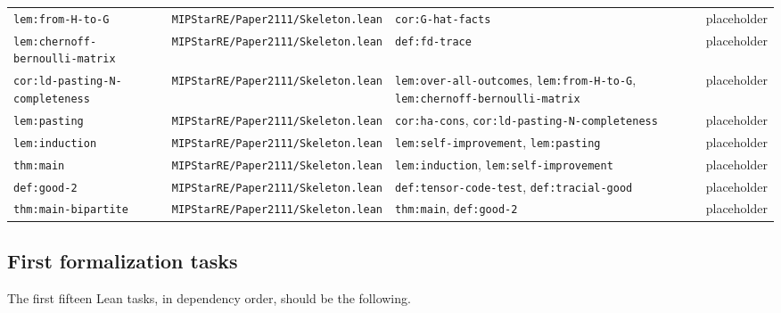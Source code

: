 \documentclass{article}
\theoremstyle{remark}
\begin{document}
\begin{longtable}{L{0.18\textwidth}L{0.25\textwidth}L{0.32\textwidth}L{0.13\textwidth}}
\texttt{lem:from-H-to-G} & \texttt{MIPStarRE/Paper2111/Skeleton.lean} & \texttt{cor:G-hat-facts} & placeholder \\
\texttt{lem:chernoff-bernoulli-matrix} & \texttt{MIPStarRE/Paper2111/Skeleton.lean} & \texttt{def:fd-trace} & placeholder \\
\texttt{cor:ld-pasting-N-completeness} & \texttt{MIPStarRE/Paper2111/Skeleton.lean} & \texttt{lem:over-all-outcomes}, \texttt{lem:from-H-to-G}, \texttt{lem:chernoff-bernoulli-matrix} & placeholder \\
\texttt{lem:pasting} & \texttt{MIPStarRE/Paper2111/Skeleton.lean} & \texttt{cor:ha-cons}, \texttt{cor:ld-pasting-N-completeness} & placeholder \\
\texttt{lem:induction} & \texttt{MIPStarRE/Paper2111/Skeleton.lean} & \texttt{lem:self-improvement}, \texttt{lem:pasting} & placeholder \\
\texttt{thm:main} & \texttt{MIPStarRE/Paper2111/Skeleton.lean} & \texttt{lem:induction}, \texttt{lem:self-improvement} & placeholder \\
\texttt{def:good-2} & \texttt{MIPStarRE/Paper2111/Skeleton.lean} & \texttt{def:tensor-code-test}, \texttt{def:tracial-good} & placeholder \\
\texttt{thm:main-bipartite} & \texttt{MIPStarRE/Paper2111/Skeleton.lean} & \texttt{thm:main}, \texttt{def:good-2} & placeholder \\
\bottomrule
\end{longtable}
\normalsize

\subsection{First formalization tasks}

The first fifteen Lean tasks, in dependency order, should be the following.
\end{document}
